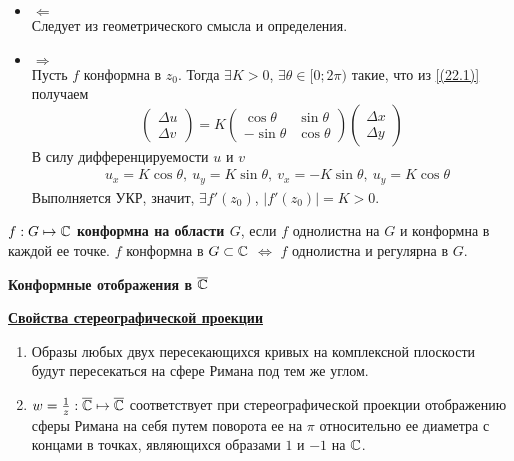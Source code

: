 \begin{itemize}
    \item $\Leftarrow$
    \\
    Следует из геометрического смысла и определения.
    \item $\Rightarrow$
    \\
    Пусть $f$ конформна в $z_0$. Тогда $\exists K > 0$, $\exists \theta \in
    [0;2\pi)$ такие, что из \eqref{(22.1)} получаем
    \begin{equation}\label{(22.2)}
        \left( \begin{matrix}
                \Delta u \\
                \Delta v
            \end{matrix} \right) = K \left( \begin{matrix}
                \cos \theta & \sin \theta \\
                -\sin \theta & \cos \theta
            \end{matrix} \right) \left( \begin{matrix}
                \Delta x \\
                \Delta y
            \end{matrix} \right)
    \end{equation}
    В силу дифференцируемости $u$ и $v$
    \begin{align*}
      & u_x = K \cos \theta, \ u_y = K \sin \theta, \ v_x = -K \sin \theta, \ u_y = K \cos \theta
    \end{align*}
    Выполняется УКР, значит, $\exists f'(z_0)$, $\left| f'(z_0) \right| = K >
    0$.
\end{itemize}
\Def
$f: G \mapsto \mathbb{C}$ \textbf{конформна на области $G$}, если $f$ однолистна на $G$
и конформна в каждой ее точке.
\corollary
$f$ конформна в $G \subset \mathbb{C}$ $\Leftrightarrow$ $f$ однолистна и регулярна в
$G$.
\begin{center}
    \textbf{Конформные отображения в $\overline{\mathbb{C}}$}
\end{center}
\underline{\textbf{Свойства стереографической проекции}}
\begin{enumerate}
    \item Образы любых двух пересекающихся кривых на комплексной плоскости будут
    пересекаться на сфере Римана под тем же углом.
    \item $w = \frac{1}{z}: \overline{\mathbb{C}} \mapsto \overline{\mathbb{C}}$ соответствует при
    стереографической проекции отображению сферы Римана на себя путем поворота
    ее на $\pi$ относительно ее диаметра с концами в точках, являющихся образами
    $1$ и $-1$ на $\mathbb{C}$.
\end{enumerate}
